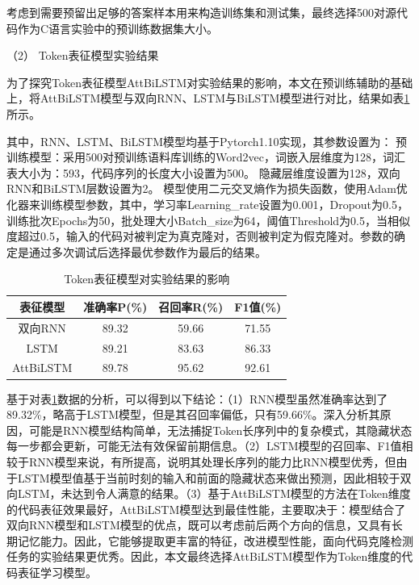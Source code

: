 考虑到需要预留出足够的答案样本用来构造训练集和测试集，最终选择500对源代码作为C语言实验中的预训练数据集大小。

（2） Token表征模型实验结果

为了探究Token表征模型AttBiLSTM对实验结果的影响，本文在预训练辅助的基础上，将AttBiLSTM模型与双向RNN、LSTM与BiLSTM模型进行对比，结果如表\ref{tab:category2}所示。

其中，RNN、LSTM、BiLSTM模型均基于Pytorch1.10实现，其参数设置为： 预训练模型：采用500对预训练语料库训练的Word2vec，词嵌入层维度为128，词汇表大小为：593，代码序列的长度大小设置为500。 隐藏层维度设置为128，双向RNN和BiLSTM层数设置为2。 模型使用二元交叉熵作为损失函数，使用Adam优化器来训练模型参数，其中，学习率Learning\_rate设置为0.001，Dropout为0.5，训练批次Epochs为50，批处理大小Batch\_size为64，阈值Threshold为0.5，当相似度超过0.5，输入的代码对被判定为真克隆对，否则被判定为假克隆对。参数的确定是通过多次调试后选择最优参数作为最后的结果。

\begin{table}[htp] 
  \centering  
  \caption{Token表征模型对实验结果的影响}   
  \label{tab:category2}  
  \begin{tabular*}{0.9\textwidth}{@{\extracolsep{\fill}}cccc}  
  \toprule  
  表征模型 & 准确率P(\%) & 召回率R(\%) & F1值(\%)  \\  
  \midrule
  双向RNN     & 89.32	& 59.66	& 71.55		 \\
  LSTM			  & 89.21	& 83.63	& 86.33		 \\  
  AttBiLSTM		& 89.78	& 95.62	& 92.61		\\  
  \bottomrule  
  \end{tabular*}  
\end{table}

基于对表\ref{tab:category2}数据的分析，可以得到以下结论：（1）RNN模型虽然准确率达到了89.32\%，略高于LSTM模型，但是其召回率偏低，只有59.66\%。深入分析其原因，可能是RNN模型结构简单，无法捕捉Token长序列中的复杂模式，其隐藏状态每一步都会更新，可能无法有效保留前期信息。（2）LSTM模型的召回率、F1值相较于RNN模型来说，有所提高，说明其处理长序列的能力比RNN模型优秀，但由于LSTM模型值基于当前时刻的输入和前面的隐藏状态来做出预测，因此相较于双向LSTM，未达到令人满意的结果。（3）基于AttBiLSTM模型的方法在Token维度的代码表征效果最好，AttBiLSTM模型达到最佳性能，主要取决于：模型结合了双向RNN模型和LSTM模型的优点，既可以考虑前后两个方向的信息，又具有长期记忆能力。因此，它能够提取更丰富的特征，改进模型性能，面向代码克隆检测任务的实验结果更优秀。因此，本文最终选择AttBiLSTM模型作为Token维度的代码表征学习模型。


